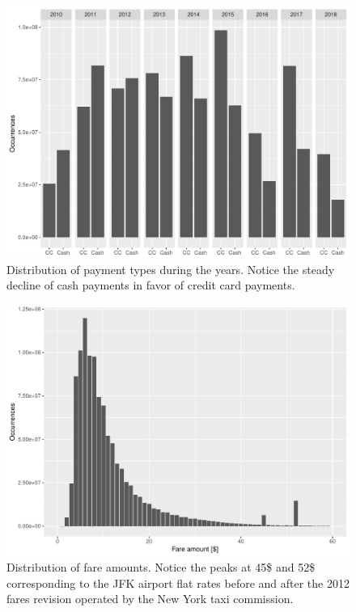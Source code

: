 \documentclass{acm_proc_article-sp-sigmod09}
\begin{document}
\begin{figure}
	\centering
	\includegraphics[width=1\columnwidth]{resources/base_plots/payment_type_distr.pdf}
	\caption{Distribution of payment types during the years. Notice the steady decline of cash payments in favor of credit card payments.}
	\label{fig:paymentTypeByYear}
\end{figure}

\begin{figure}
	\centering
	\includegraphics[width=1\columnwidth]{resources/base_plots/fare_amount_distr.pdf}
	\caption{Distribution of fare amounts. Notice the peaks at 45\$ and 52\$ corresponding to the JFK airport flat rates before and after the 2012 fares revision operated by the New York taxi commission.}
	\label{fig:fareAmountDistr}
\end{figure}
\end{document}
